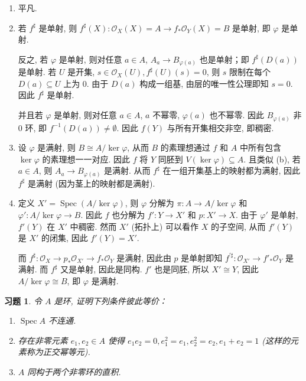 \documentclass{article}
\theoremstyle{exercise}
\newtheorem{exercise}{习题}[section]
\newenvironment{proofc}{\proof}{\endproof}
\def\cO{\mathscr{O}}
\def\Spec{\operatorname{Spec}}
\begin{document}
\begin{proofc}
  \begin{enumerate}[label={(\alph*)}]
    \item 平凡.
    \item 若 $f^\sharp$ 是单射, 则 $f^\sharp(X) \colon \cO_X(X) = A \to f_*\cO_Y(X) = B$
          是单射, 即 $\varphi$ 是单射.

          反之, 若 $\varphi$ 是单射, 则对任意 $a \in A$,
          $A_a \to B_{\varphi(a)}$ 也是单射；即 $f^\sharp(D(a))$ 是单射.
          若 $U$ 是开集, $s \in \cO_X(U), f^\sharp(U)(s) = 0$,
          则 $s$ 限制在每个 $D(a) \subseteq U$ 上为 $0$.
          由于 $D(a)$ 构成一组基, 由层的唯一性公理即知 $s = 0$. 因此 $f^\sharp$ 是单射.

          并且若 $\varphi$ 是单射, 则对任意 $a \in A$, $a$ 不幂零, $\varphi(a)$ 也不幂零.
          因此 $B_{\varphi(a)}$ 非 $0$ 环, 即 $f^{-1}(D(a)) \neq \emptyset$.
          因此 $f(Y)$ 与所有开集相交非空, 即稠密.
    \item 设 $\varphi$ 是满射, 则 $B \cong A / \ker \varphi$,
          从而 $B$ 的素理想通过 $f$ 和 $A$ 中所有包含 $\ker \varphi$ 的素理想一一对应.
          因此 $f$ 将 $Y$ 同胚到 $V(\ker \varphi) \subseteq A$.
          且类似 (b), 若 $a \in A$, 则 $A_a \to B_{\varphi(a)}$ 是满射.
          从而 $f^\sharp$ 在一组开集基上的映射都为满射, 因此 $f^\sharp$ 是满射
          (因为茎上的映射都是满射).
    \item 定义 $X' = \Spec(A / \ker \varphi)$,
          则 $\varphi$ 分解为 $\pi \colon A \to A / \ker \varphi$
          和 $\varphi' \colon A / \ker \varphi \to B$.
          因此 $f$ 也分解为 $f' \colon Y \to X'$ 和 $p \colon X' \to X$.
          由于 $\varphi'$ 是单射, $f'(Y)$ 在 $X'$ 中稠密.
          然而 $X'$ (拓扑上) 可以看作 $X$ 的子空间,
          从而 $f'(Y)$ 是 $X'$ 的闭集, 因此 $f'(Y) = X'$.

          而 $f^\sharp \colon \cO_X \to p_*\cO_{X'} \to f_* \cO_Y$ 是满射,
          因此由 $p$ 是单射即知 $f^{\prime\sharp} \colon \cO_{X'} \to f'_*\cO_Y$ 是满射.
          而 $f^\sharp$ 又是单射, 因此是同构.
          $f'$ 也是同胚, 所以 $X' \cong Y$, 因此 $A / \ker \varphi \cong B$, 即 $\varphi$ 是满射.
          \qedhere
  \end{enumerate}
\end{proofc}

\begin{exercise}
  令 $A$ 是环, 证明下列条件彼此等价：
  \begin{enumerate}[label={\arabic*)}]
    \item $\Spec A$ 不连通.
    \item 存在非零元素 $e_1, e_2 \in A$ 使得 $e_1e_2 = 0, e_1^2 = e_1, e_2^2 = e_2, e_1 + e_2 = 1$
          (这样的元素称为\emph{正交幂等元}).
    \item $A$ 同构于两个非零环的直积.
  \end{enumerate}
\end{exercise}
\end{document}
